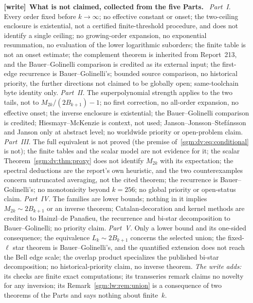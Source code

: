 \documentclass[11pt,letterpaper]{article}
\theoremstyle{remark}\newtheorem{remark}[theorem]{Remark}
\newenvironment{writenote}[1][]{\par\smallskip\begingroup\small
 \noindent\textbf{[write]}\if\relax\detokenize{#1}\relax\else~\textbf{#1.}\fi\ }%
 {\par\endgroup\smallskip}
\theoremstyle{definition}\newtheorem{definition}[theorem]{Definition}
\begin{document}
\begin{writenote}[What is not claimed, collected from the five Parts]
\emph{Part~I.} Every order fixed before $k\to\infty$; no effective constant
or onset; the two-ceiling enclosure is existential, not a certified
finite-threshold procedure, and does not identify a single ceiling; no
growing-order expansion, no exponential resummation, no evaluation of the
lower logarithmic suborders; the finite table is not an onset estimate; the
complement theorem is inherited from Report~213, and the Bauer--Golinelli
comparison is credited as its external input; the first-edge recurrence is
Bauer--Golinelli's; bounded source comparison, no historical priority, the
further directions not claimed to be globally open; same-toolchain byte
identity only. \emph{Part~II.} The superpolynomial strength applies to the two
tails, not to $M_{2k}/(2B_{k+1})-1$; no first correction, no all-order
expansion, no effective onset; the inverse enclosure is existential; the
Bauer--Golinelli comparison is credited; Hiesmayr--McKenzie is context, not
used; Janson--Jonsson--Stef\'ansson and Janson only at abstract level; no
worldwide priority or open-problem claim. \emph{Part~III.} The full
equivalent is not proved (the premise of~\eqref{sgm:dv:eq:conditional} is
not); the finite tables and the scalar model are not evidence for it; the
scalar Theorem~\ref{sgm:dv:thm:proxy} does not identify $M_{2k}$ with its
expectation; the spectral deductions are the report's own heuristic, and the
two counterexamples concern untruncated averaging, not the cited theorem;
the recurrence is Bauer--Golinelli's; no monotonicity beyond $k=256$; no
global priority or open-status claim. \emph{Part~IV.} The families are lower
bounds; nothing in it implies $M_{2k}\sim2B_{k+1}$ or an inverse theorem;
Catalan-decoration and kernel methods are credited to Hainzl--de Panafieu,
the recurrence and bi-star decomposition to Bauer--Golinelli; no priority
claim. \emph{Part~V.} Only a lower bound and its one-sided consequence; the
equivalence $L_k\sim2B_{k+1}$ concerns the selected union; the
fixed-$\ell$ star theorem is Bauer--Golinelli's, and the quantified extension
does not reach the Bell edge scale; the overlap product specializes the
published bi-star decomposition; no historical-priority claim, no inverse
theorem. \emph{The write adds:} its checks are finite exact computations; its
transseries remark claims no novelty for any inversion; its
Remark~\ref{sgm:lw:rem:union} is a consequence of two theorems of the Parts
and says nothing about finite~$k$.
\end{writenote}
\end{document}
